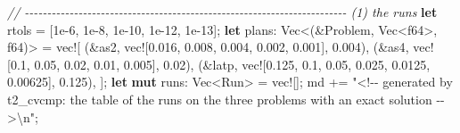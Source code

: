 \documentclass[
  10pt,
]{article}
\newenvironment{Shaded}{}{}
\newcommand{\CommentTok}[1]{\textcolor[rgb]{0.38,0.63,0.69}{\textit{#1}}}
\newcommand{\DataTypeTok}[1]{\textcolor[rgb]{0.56,0.13,0.00}{#1}}
\newcommand{\DecValTok}[1]{\textcolor[rgb]{0.25,0.63,0.44}{#1}}
\newcommand{\KeywordTok}[1]{\textcolor[rgb]{0.00,0.44,0.13}{\textbf{#1}}}
\newcommand{\NormalTok}[1]{#1}
\newcommand{\OperatorTok}[1]{\textcolor[rgb]{0.40,0.40,0.40}{#1}}
\newcommand{\PreprocessorTok}[1]{\textcolor[rgb]{0.74,0.48,0.00}{#1}}
\newcommand{\SpecialCharTok}[1]{\textcolor[rgb]{0.25,0.44,0.63}{#1}}
\newcommand{\StringTok}[1]{\textcolor[rgb]{0.25,0.44,0.63}{#1}}
\begin{document}
\begin{Shaded}
\begin{Highlighting}[]
    \CommentTok{// {-}{-}{-}{-}{-}{-}{-}{-}{-}{-}{-}{-}{-}{-}{-}{-}{-}{-}{-}{-}{-}{-}{-}{-}{-}{-}{-}{-}{-}{-}{-}{-}{-}{-}{-}{-}{-}{-}{-}{-}{-}{-}{-}{-}{-}{-}{-}{-}{-}{-}{-}{-}{-}{-}{-}{-}{-}{-}{-}{-}{-}{-}{-}{-}{-}{-}{-}{-}{-}{-}{-}{-} (1) the runs}
    \KeywordTok{let}\NormalTok{ rtols }\OperatorTok{=}\NormalTok{ [}\DecValTok{1e{-}6}\OperatorTok{,} \DecValTok{1e{-}8}\OperatorTok{,} \DecValTok{1e{-}10}\OperatorTok{,} \DecValTok{1e{-}12}\OperatorTok{,} \DecValTok{1e{-}13}\NormalTok{]}\OperatorTok{;}
    \KeywordTok{let}\NormalTok{ plans}\OperatorTok{:} \DataTypeTok{Vec}\OperatorTok{\textless{}}\NormalTok{(}\OperatorTok{\&}\NormalTok{Problem}\OperatorTok{,} \DataTypeTok{Vec}\OperatorTok{\textless{}}\DataTypeTok{f64}\OperatorTok{\textgreater{},} \DataTypeTok{f64}\NormalTok{)}\OperatorTok{\textgreater{}} \OperatorTok{=} \PreprocessorTok{vec!}\NormalTok{[}
\NormalTok{        (}\OperatorTok{\&}\NormalTok{as2}\OperatorTok{,} \PreprocessorTok{vec!}\NormalTok{[}\DecValTok{0.016}\OperatorTok{,} \DecValTok{0.008}\OperatorTok{,} \DecValTok{0.004}\OperatorTok{,} \DecValTok{0.002}\OperatorTok{,} \DecValTok{0.001}\NormalTok{]}\OperatorTok{,} \DecValTok{0.004}\NormalTok{)}\OperatorTok{,}
\NormalTok{        (}\OperatorTok{\&}\NormalTok{as4}\OperatorTok{,} \PreprocessorTok{vec!}\NormalTok{[}\DecValTok{0.1}\OperatorTok{,} \DecValTok{0.05}\OperatorTok{,} \DecValTok{0.02}\OperatorTok{,} \DecValTok{0.01}\OperatorTok{,} \DecValTok{0.005}\NormalTok{]}\OperatorTok{,} \DecValTok{0.02}\NormalTok{)}\OperatorTok{,}
\NormalTok{        (}\OperatorTok{\&}\NormalTok{latp}\OperatorTok{,} \PreprocessorTok{vec!}\NormalTok{[}\DecValTok{0.125}\OperatorTok{,} \DecValTok{0.1}\OperatorTok{,} \DecValTok{0.05}\OperatorTok{,} \DecValTok{0.025}\OperatorTok{,} \DecValTok{0.0125}\OperatorTok{,} \DecValTok{0.00625}\NormalTok{]}\OperatorTok{,} \DecValTok{0.125}\NormalTok{)}\OperatorTok{,}
\NormalTok{    ]}\OperatorTok{;}
    \KeywordTok{let} \KeywordTok{mut}\NormalTok{ runs}\OperatorTok{:} \DataTypeTok{Vec}\OperatorTok{\textless{}}\NormalTok{Run}\OperatorTok{\textgreater{}} \OperatorTok{=} \PreprocessorTok{vec!}\NormalTok{[]}\OperatorTok{;}
\NormalTok{    md }\OperatorTok{+=} \StringTok{"\textless{}!{-}{-} generated by t2\_cvcmp: the table of the runs on the three problems with an exact solution {-}{-}\textgreater{}}\SpecialCharTok{\textbackslash{}n}\StringTok{"}\OperatorTok{;}

\end{Highlighting}
\end{Shaded}
\end{document}
